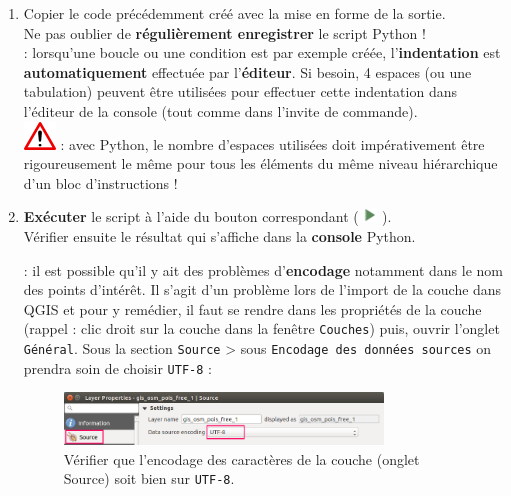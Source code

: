 \documentclass[11pt]{article}
\begin{document}
\begin{enumerate}
\begin{itemize}
\end{itemize}


\item Copier le code précédemment créé avec la mise en forme de la sortie. \\
Ne pas oublier de \textbf{régulièrement enregistrer} le script Python !\\ 






\newpage{}
\underline{}: lorsqu'une boucle ou une condition est par exemple créée, l'\textbf{indentation} est \textbf{automatiquement} effectuée par l'\textbf{éditeur}. Si besoin, 4 espaces (ou une tabulation) peuvent être utilisées pour effectuer cette indentation dans l'éditeur de la console (tout comme dans l'invite de commande).\\

\includegraphics[scale=1]{warningt.png} \underline{}: avec Python, le nombre d'espaces utilisées doit impérativement être rigoureusement le même pour tous les éléments du même niveau hiérarchique d'un bloc d'instructions !

\vspace*{0.32em}
\item \textbf{Exécuter} le script à l'aide du bouton correspondant ( \includegraphics[width=1em]{mActionStart.png} ). \\
Vérifier ensuite le résultat qui s'affiche dans la \textbf{console} Python.


\underline{}: il est possible qu'il y ait des problèmes d'\textbf{encodage} notamment dans le nom des points d'intérêt. Il s'agit d'un problème lors de l'import de la couche dans QGIS et pour y remédier, il faut se rendre dans les propriétés de la couche (rappel : clic droit sur la couche dans la fenêtre \og{}\texttt{Couches}\fg{}) puis, ouvrir l'onglet \texttt{Général}. Sous la section \og{}\texttt{Source}\fg{} > sous \og{}\texttt{Encodage des données sources}\fg{} on prendra soin de choisir \og{}\texttt{UTF-8}\fg{} :
\vspace*{-0.4em}
\begin{figure}[H]
\centering
\includegraphics[width=0.8\textwidth]{utf8.png}
\vspace*{-0.4em}
\caption{Vérifier que l'encodage des caractères de la couche (onglet \og{}Source\fg{}) soit bien sur \texttt{UTF-8}.}
\label{utf8}
\end{figure}
\vspace*{-1em}



\end{enumerate}
\end{document}
